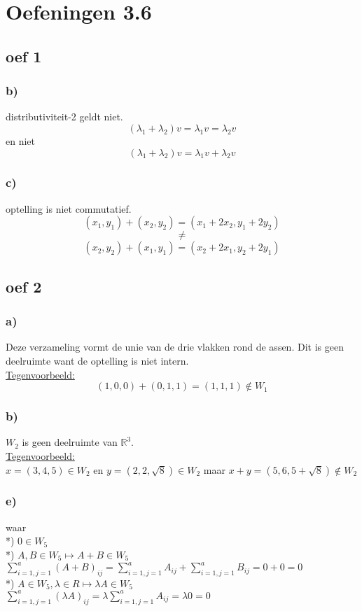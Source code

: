\documentclass[lineaire_algebra_oplossingen.tex]{subfiles}
\begin{document}
\section{Oefeningen 3.6}
\subsection{oef 1}
\subsubsection*{b)}
distributiviteit-2 geldt niet.
\[
(\lambda_1 + \lambda_2)v = \lambda_1v = \lambda_2v
\]
en niet
\[
(\lambda_1 + \lambda_2)v = \lambda_1v+\lambda_2v
\]

\subsubsection*{c)}
optelling is niet commutatief.
\[
(x_1,y_1) + (x_2,y_2) = (x_1+2x_2,y_1+2y_2)
\]
\[ \neq \]
\[
(x_2,y_2) + (x_1,y_1) = (x_2+2x_1,y_2+2y_1)
\]

\subsection{oef 2}
\subsubsection*{a)}
Deze verzameling vormt de unie van de drie vlakken rond de assen. Dit is geen deelruimte want de optelling is niet intern.\\
\underline{Tegenvoorbeeld:}\\
\[
(1,0,0) + (0,1,1) = (1,1,1) \not \in W_1
\]
\subsubsection*{b)}
$W_2$ is geen deelruimte van $\mathbb{R}^{3}$.\\
\underline{Tegenvoorbeeld:}\\
$x = (3, 4, 5) \in W_2$ en $y = (2, 2, \sqrt{8}) \in W_2$ maar $x + y = (5, 6, 5 + \sqrt{8}) \not \in W_2$

\subsubsection*{e) }
waar\\
*) $0 \in W_5$ \\
*) $A,B \in W_5 \longmapsto A+B \in W_5$ \\
$ \sum\limits_{i=1,j=1}^a (A+B)_{ij} = \sum\limits_{i=1,j=1}^a A_{ij} + \sum\limits_{i=1,j=1}^a B_{ij} = 0+0 = 0 $ \\
*) $ A \in W_5, \lambda \in R \longmapsto \lambda A \in W_5$ \\
$ \sum\limits_{i=1,j=1}^a (\lambda A)_{ij} = \lambda \sum\limits_{i=1,j=1}^a A_{ij} = \lambda 0 = 0$
\end{document}
